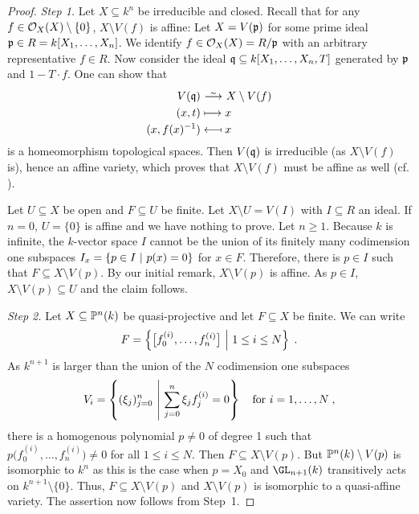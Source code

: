 \documentclass[a4paper,parskip=half,numbers=enddot, DIV=12]{scrreprt}
\begin{document}
\begin{proof}
	\emph{Step 1.} Let $X\subseteq k^n$ be irreducible and closed. Recall that for any $f\in \mathcal{O}_X(X)\setminus\{0\}$, $X\setminus V(f)$ is affine: Let $X=V(\mathfrak{p})$ for some prime ideal $\mathfrak{p}\in R=k[X_1,\ldots,X_n]$. We identify $f\in \mathcal{O}_X(X)=R/\mathfrak{p}$ with an arbitrary representative $f\in R$. Now consider the ideal $\mathfrak{q}\subseteq k[X_1,\ldots,X_n,T]$ generated by $\mathfrak{p}$ and $1-T\cdot f$. One can show that
	\begin{align*}
		V(\qq) &\isomorphism X\setminus V(f)\\
		(x,t) &\longmapsto x \\
		(x,f(x)^{-1}) &\longmapsfrom x
	\end{align*}
	is a homeomorphism topological spaces. Then $V(\mathfrak{q})$ is irreducible (as $X\setminus V(f)$ is), hence an affine variety, which proves that $X\setminus V(f)$ must be affine as well (cf. \cite[Proposition~2.2.4]{alg1}).
	
	Let $U\subseteq X$ be open and $F\subseteq U$ be finite. Let $X\setminus U = V(I)$ with $I\subseteq R$ an ideal. If $n=0$, $U = \{0\}$ is affine and we have nothing to prove. Let $n\geq 1$. Because $k$ is infinite, the $k$-vector space $I$ cannot be the union of its finitely many codimension one subspaces $I_x=\left\{p\in I\ \middle|\  p(x) = 0\right\}$ for $x\in F$. Therefore, there is $p\in I$ such that $F\subseteq X\setminus V(p)$. By our initial remark, $X\setminus V(p)$ is affine. As $p\in I$, $X\setminus V(p)\subseteq U$ and the claim follows.
	
	\emph{Step 2.} Let $X\subseteq \mathbb{P}^n(k)$ be quasi-projective and let $F\subseteq X$ be finite. We can write 
	\begin{align*}
		F=\left\{\big[f_0^{(i)},\ldots, f_n^{(i)}\big]\ \middle|\  1\leq i \leq N\right\}\;.
	\end{align*} 
	As $k^{n+1}$ is larger than the union of the $N$ codimension one subspaces \begin{align*}
		V_i=\left\{(\xi_j)_{j=0}^n\ \middle|\  \sum_{j=0}^n \xi_j f_j^{(i)} = 0\right\}\quad\text{for }i=1,\ldots,N\;,
	\end{align*} 
	there is a homogenous polynomial $p\neq 0$ of degree 1 such that $p\big(f_0^{(i)},\ldots, f_n^{(i)}\big) \neq 0$ for all $1\leq i\leq N$. Then $F\subseteq X\setminus V(p)$. But $\mathbb{P}^n(k)\setminus V(p)$ is isomorphic to $k^n$ as this is the case when $p= X_0$ and $\GL_{n+1}(k)$ transitively acts on $k^{n+1}\setminus\{0\}$. Thus, $F\subseteq X\setminus V(p)$ and $X\setminus V(p)$ is isomorphic to a quasi-affine variety. The assertion now follows from Step~1.
\end{proof}
\end{document}

